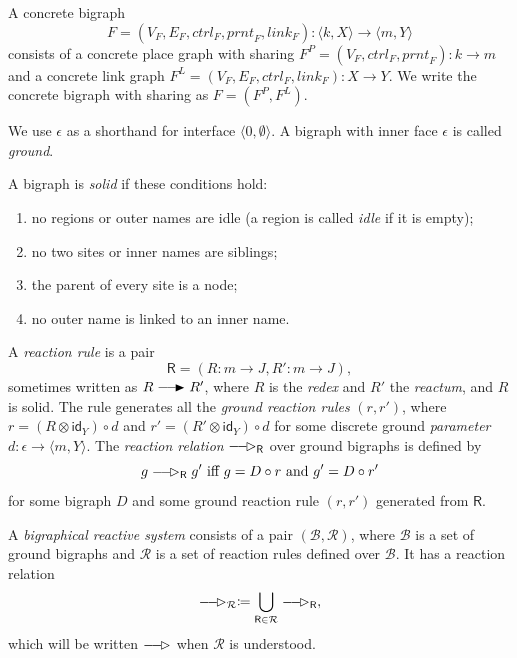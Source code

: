 \documentclass[runningheads]{llncs}
\newcommand\ctrl{\mathit{ctrl}}
\newcommand\prnt{\mathit{prnt}}
\newcommand\link{\mathit{link}}
\newcommand\id{\mathsf{id}}
\providecommand\longrightarrowRHD{\relbar\joinrel\relbar\joinrel\mathrel\RHD}
\providecommand\longrightarrowrhd{\relbar\joinrel\relbar\joinrel\mathrel\rhd}
\begin{document}
\begin{definition}
  A concrete bigraph
  \[ F = (V_F, E_F, \ctrl_F, \prnt_F, \link_F) : \langle k, X \rangle \to
    \langle m, Y \rangle \]
  consists of a concrete place graph with sharing $F^P = (V_F, \ctrl_F, \prnt_F)
  : k \to m$ and a concrete link graph $F^L = (V_F, E_F, \ctrl_F, \link_F) : X
  \to Y$. We write the concrete bigraph with sharing as $F = (F^P, F^L)$.
\end{definition}

We use $\epsilon$ as a shorthand for interface $\langle 0, \emptyset \rangle$. A
bigraph with inner face $\epsilon$ is called \emph{ground}.

\begin{definition}
  A bigraph is \emph{solid} if these conditions hold:
  \begin{enumerate}
  \item no regions or outer names are idle (a region is called \emph{idle}
    if it is empty);
  \item no two sites or inner names are siblings;
  \item the parent of every site is a node;
  \item no outer name is linked to an inner name.
  \end{enumerate}
\end{definition}

\begin{definition} \label{reaction_rule}
  A \emph{reaction rule} is a pair
  \[ \mathsf{R} = (R : m \to J, R' : m \to J), \]
  sometimes written as $R \longrightarrowRHD R'$, where $R$ is the \emph{redex}
  and $R'$ the \emph{reactum}, and $R$ is solid. The rule generates all the
  \emph{ground reaction rules} $(r, r')$, where $r = (R \otimes \id_Y) \circ d$
  and $r' = (R' \otimes \id_Y) \circ d$ for some discrete ground
  \emph{parameter} $d : \epsilon \to \langle m, Y \rangle$. The \emph{reaction
    relation} $\longrightarrowrhd_{\mathsf{R}}$ over ground bigraphs is defined
  by
  \[ g \longrightarrowrhd_{\mathsf{R}} g' \text{ iff } g = D \circ r \text{ and
    } g' = D \circ r' \]
  for some bigraph $D$ and some ground reaction rule $(r, r')$ generated from
  $\mathsf{R}$.
\end{definition}

\begin{definition}
  A \emph{bigraphical reactive system} consists of a pair $(\mathcal{B},
  \mathcal{R})$, where $\mathcal{B}$ is a set of ground bigraphs and
  $\mathcal{R}$ is a set of reaction rules defined over $\mathcal{B}$. It has a
  reaction relation
  \[ \longrightarrowrhd_{\mathcal{R}} \coloneqq \bigcup_{\mathsf{R} \in
      \mathcal{R}} \longrightarrowrhd_{\mathsf{R}}, \]
  which will be written $\longrightarrowrhd$ when $\mathcal{R}$ is understood.
\end{definition}
\end{document}
